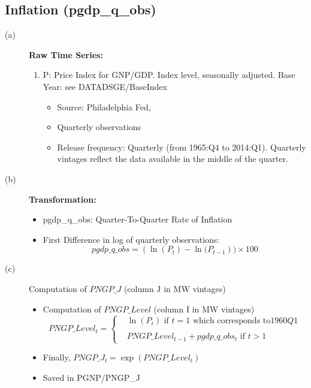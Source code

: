 \documentclass[3p,review,times]{elsarticle}		%
\begin{document}
\subsection{Inflation (pgdp\_q\_obs)}
\begin{description}
	\item[(a)] \textbf{Raw Time Series:}
	\begin{enumerate}
		\item P: Price Index for GNP/GDP. Index level, seasonally adjusted. Base Year: see DATADSGE/BaseIndex
		\begin{itemize}
			\item Source: Philadelphia Fed,
			\item Quarterly observations
			\item Release frequency: Quarterly (from 1965:Q4 to 2014:Q1). Quarterly vintages reflect the data available in the middle of the quarter.
		\end{itemize}
	\end{enumerate}
	\item[(b)] \textbf{Transformation:}
	\begin{itemize}
		\item pgdp\_q\_obs: Quarter-To-Quarter Rate of Inflation
		\item First Difference in log of quarterly observations:
		$$pgdp\_q\_obs=\left(\ln(P_t)-\ln(P_{t-1}\right))\times 100$$
	\end{itemize}
	\item[(c)] Computation of $PNGP\_J$ (column J in MW vintages)
	\begin{itemize}
		\item Computation of $PNGP\_Level$ (column I in MW vintages)
		$$PNGP\_Level_t=\left\{\begin{array}{cc}
		&\ln(P_t)\mbox{ if }t=1\mbox{ which corresponds to}1960Q1\\
		\\
		&PNGP\_Level_{t-1}+pgdp\_q\_obs_t\mbox{ if }t> 1
		\end{array}\right.$$
		\item Finally, $PNGP\_J_t=\exp(PNGP\_Level_t)$
		\item Saved in PGNP/PNGP\_J
	\end{itemize}
\end{description}
\end{document}
